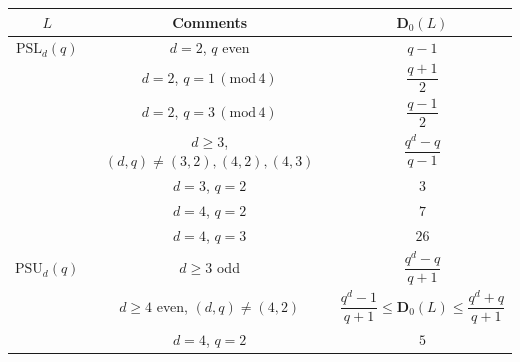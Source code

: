 \documentclass{daj}
\theoremstyle{definition}
\theoremstyle{remark}
\newcommand{\PSL}{\mathrm{PSL}}
\newcommand{\D}{\mathbf{D}}
\begin{document}
{\small 
\begin{table}[ht]
	\centering
	\begin{tabular}{| c c | c |}
		\hline
		
		\phantom{$\dfrac{1^1}{1_{1_1}}$}\hspace{-6mm}
		$L$ & Comments  & $\D_0(L)$ \\
		
		\hline \hline
		
		\phantom{$\dfrac{1^1}{1_{1_1}}$}\hspace{-6mm}
		$\PSL_d(q)$ & $d=2$, $q$ even & $q-1$ \\
		
		\phantom{$\dfrac{1^1}{1_{1_1}}$}\hspace{-6mm}
		& $d=2$, $q = 1\, (\mathrm{mod}\,4) $ & $\dfrac{q+1}{2}$ \\
		
		\phantom{$\dfrac{1^1}{1_{1_1}}$}\hspace{-6mm}
		& $d=2$, $q = 3\, (\mathrm{mod}\,4) $ & $\dfrac{q-1}{2}$ \\
		
		\phantom{$\dfrac{1^1}{1_{1_1}}$}\hspace{-6mm}
		& $d\geq 3$, $(d,q) \ne (3,2),(4,2),(4,3)$ & $\dfrac{q^d -q}{q-1}$ \\
		
		\phantom{$\dfrac{1^1}{1_{1_1}}$}\hspace{-6mm}
		& $d = 3$, $q=2$ & $3$ \\
		
		\phantom{$\dfrac{1^1}{1_{1_1}}$}\hspace{-6mm}
		& $d = 4$, $q=2$ & $7$ \\
		
		\phantom{$\dfrac{1^1}{1_{1_1}}$}\hspace{-6mm}
		& $d = 4$, $q=3$ & $26$ \\
		
		\phantom{$\dfrac{1^1}{1_{1_1}}$}\hspace{-6mm}
		$\mathrm{PSU}_d(q)$ & $d\geq 3$ odd & $\dfrac{q^d-q}{q+1}$ \\
		
		\phantom{$\dfrac{1^1}{1_{1_1}}$}\hspace{-6mm}
		& $d\geq 4$ even, $(d,q) \ne (4,2)$ & $\dfrac{q^d-1}{q+1} \leq \D_0(L) \leq \dfrac{q^d+q}{q+1}$ \\
		
		\phantom{$\dfrac{1^1}{1_{1_1}}$}\hspace{-6mm}
		& $d=4$, $q=2$ & $5$ \\
		

\end{tabular}
\end{table}}
\end{document}

